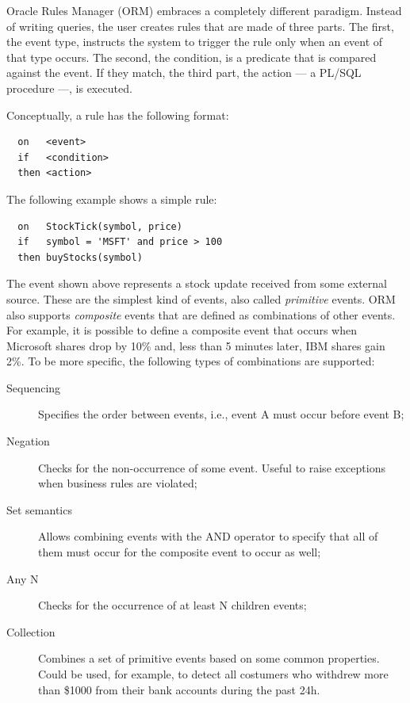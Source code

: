 \documentclass{report}
\begin{document}
Oracle Rules Manager (ORM) embraces a completely different
paradigm. Instead of writing queries, the user creates rules that are
made of three parts. The first, the event type, instructs the system
to trigger the rule only when an event of that type occurs. The
second, the condition, is a predicate that is compared against the
event. If they match, the third part, the action --- a PL/SQL
procedure ---, is executed.

Conceptually, a rule has the following format:

\lstset{
  language=Oracle,
  columns=fullflexible,
  basicstyle=\tt,
  keywordstyle=\bf,
}


\begin{lstlisting}
  on   <event>
  if   <condition>
  then <action>
\end{lstlisting}

The following example shows a simple rule:

\begin{lstlisting}
  on   StockTick(symbol, price)
  if   symbol = 'MSFT' and price > 100
  then buyStocks(symbol)
\end{lstlisting}

The event shown above represents a stock update received from some
external source. These are the simplest kind of events, also called
\emph{primitive} events. ORM also supports \emph{composite} events
that are defined as combinations of other events. For example, it is
possible to define a composite event that occurs when Microsoft shares
drop by 10\% and, less than 5 minutes later, IBM shares gain 2\%. To
be more specific, the following types of combinations are supported:
\begin{description}
\item [Sequencing] Specifies the order between events, i.e., event A
  must occur before event B;
\item [Negation] Checks for the non-occurrence of some event. Useful
  to raise exceptions when business rules are violated;
\item [Set semantics] Allows combining events with the AND operator to
  specify that all of them must occur for the composite event to occur
  as well;
\item [Any N] Checks for the occurrence of at least N children events;
\item [Collection] Combines a set of primitive events based on some
  common properties. Could be used, for example, to detect all
  costumers who withdrew more than \$1000 from their bank accounts
  during the past 24h.
\end{description}
\end{document}
